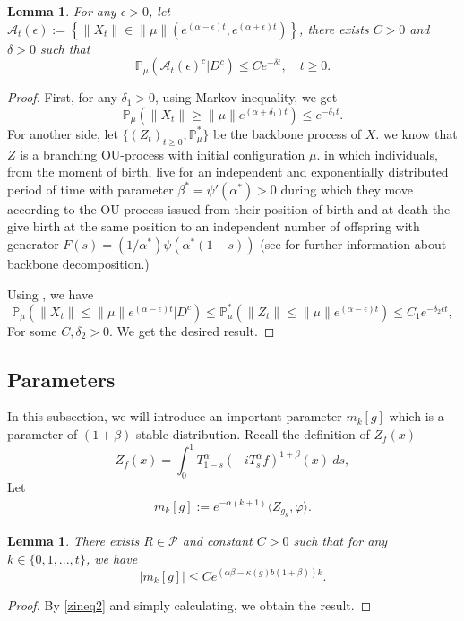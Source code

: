 \documentclass[12pt, a4paper]{amsart}
\newtheorem{lem}[thm]{Lemma}
\theoremstyle{definition}
\numberwithin{equation}{section}
\begin{document}
\begin{lem}\label{lemma28}
  For any $\epsilon>0$, let $\mathcal{A}_t(\epsilon):=\left\{ \|X_t\|\in \|\mu\|\left(e^{(\alpha-\epsilon)t},e^{(\alpha+\epsilon)t}\right)\right\}$, there exists $C>0$ and $\delta>0$ such that 
  $$\mathbb{P}_{\mu}\left(\mathcal{A}_t(\epsilon)^c|D^c\right)\leq C e^{-\delta t},\quad t\geq 0.$$
\end{lem}

\begin{proof}
    First, for any $\delta_1>0$, using Markov inequality, we get
    $$\mathbb{P}_{\mu}(\|X_t\|\geq\|\mu\|e^{(\alpha+\delta_1)t})\leq e^{-\delta_1 t}.$$ 
    For another side, let $\{(Z_t)_{t\geq 0}, \mathbb{P}^{\ast}_{\mu}\}$ be the backbone process of $X$. we know that $Z$ is a branching OU-process with initial configuration $\mu$. in which individuals, from the moment of birth, live for an independent and exponentially distributed period of time with parameter $\beta^{\ast}=\psi'(\alpha^{\ast})>0$ during which they move according to the OU-process issued from their position of birth and at death the give birth at the same position to an independent number of offspring with generator $F(s)=(1/\alpha^{\ast})\psi(\alpha^{\ast}(1-s))$ (see \cite{BAM} for further information about backbone decomposition.)
    
    Using \cite[Fact 1.8]{MM}, we have
    $$\mathbb{P}_{\mu}\left(\|X_t\|\leq \|\mu\|e^{(\alpha-\epsilon)t}|D^c\right)\leq\mathbb{P}^{\ast}_{\mu}\left(\|Z_t\|\leq \|\mu\|e^{(\alpha-\epsilon)t}\right) \leq C_1 e^{-\delta_2\epsilon t}, $$
   For some $C,\delta_2>0$.  We get the desired result.
\end{proof}

\subsection{Parameters}
 In this subsection, we will introduce an important parameter $m_k[g]$ which is a parameter of $(1+\beta)$-stable distribution. Recall the definition of $Z_f(x)$
 $$Z_f(x)=\int_0^1 T^{\alpha}_{1-s}(-iT_s^{\alpha}f)^{1+\beta}(x)~ds,$$
 Let
 \begin{align}
      m_k[g]:=e^{-\alpha(k+1)}\langle Z_{g_k},\varphi\rangle.
 \end{align}
\begin{lem}\label{mgineq1}
There exists $R\in \mathcal{P}$ and constant $C>0$ such that for any $k\in \{0,1,...,t\}$, we have 
$$|m_k[g]|\leq C e^{(\alpha\beta-\kappa(g)b(1+\beta))k}.$$
\end{lem}
\begin{proof}
    By \eqref{zineq2} and simply calculating, we obtain the result.
\end{proof}
\end{document}
